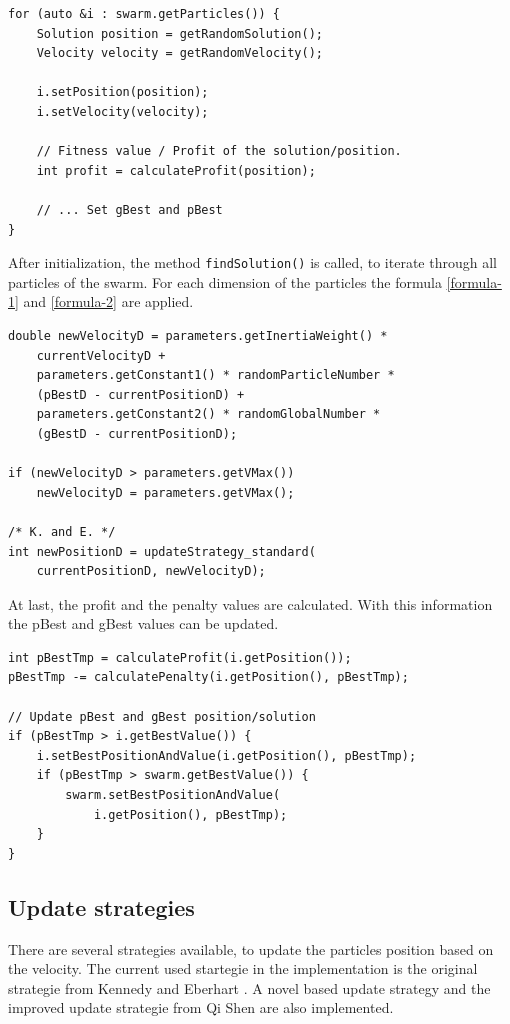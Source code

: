 \documentclass{article}
\begin{document}
\begin{lstlisting}[caption="Solver.cpp"]
for (auto &i : swarm.getParticles()) {
	Solution position = getRandomSolution();
   	Velocity velocity = getRandomVelocity();

	i.setPosition(position);
	i.setVelocity(velocity);
	
	// Fitness value / Profit of the solution/position.
	int profit = calculateProfit(position);
	
	// ... Set gBest and pBest
}
\end{lstlisting}

After initialization, the method \lstinline$findSolution()$ is called, to iterate through all particles of the swarm. For each dimension of the particles the formula \ref{formula-1} and \ref{formula-2} are applied.

\begin{lstlisting}[caption="Solver.cpp"]
double newVelocityD = parameters.getInertiaWeight() *
	currentVelocityD +
	parameters.getConstant1() * randomParticleNumber *
	(pBestD - currentPositionD) +
	parameters.getConstant2() * randomGlobalNumber *
	(gBestD - currentPositionD);

if (newVelocityD > parameters.getVMax())
	newVelocityD = parameters.getVMax();

/* K. and E. */
int newPositionD = updateStrategy_standard(
	currentPositionD, newVelocityD);
\end{lstlisting}

At last, the profit and the penalty values are calculated. With this information the pBest and gBest values can be updated.

\begin{lstlisting}[caption="Solver.cpp"]
int pBestTmp = calculateProfit(i.getPosition());
pBestTmp -= calculatePenalty(i.getPosition(), pBestTmp);

// Update pBest and gBest position/solution
if (pBestTmp > i.getBestValue()) {
	i.setBestPositionAndValue(i.getPosition(), pBestTmp);
	if (pBestTmp > swarm.getBestValue()) {
	    swarm.setBestPositionAndValue(
	    	i.getPosition(), pBestTmp);
	}
}
\end{lstlisting}

\subsection{Update strategies}
There are several strategies available, to update the particles position based on the velocity. The current used startegie in the implementation is the original strategie from Kennedy and Eberhart \cite{bib-discrete}. A novel based update strategy \cite{bib-novel} and the improved update strategie from Qi Shen are also implemented.
\end{document}
